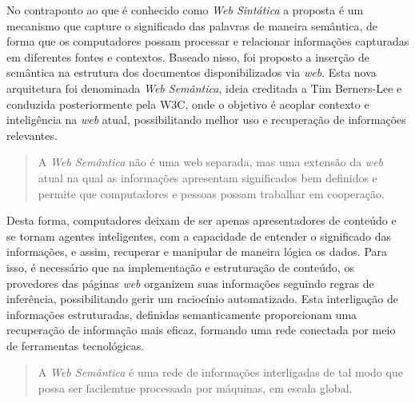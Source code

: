 No contraponto ao que é conhecido como \textit{Web Sintática}\cite{berners:2001} a proposta é um mecanismo que capture o significado das palavras de maneira semântica, de forma que os computadores possam processar e relacionar informações capturadas em diferentes fontes e contextos. Baseado nisso, foi proposto a inserção de semântica na estrutura dos documentos disponibilizados via \textit{web}\cite{breitman:2006}. Esta nova arquitetura foi denominada \textit{Web Semântica}, ideia creditada a Tim Berners-Lee e conduzida posteriormente pela W3C, onde o objetivo é acoplar contexto e inteligência na \textit{web} atual, possibilitando melhor uso e recuperação de informações relevantes\cite{souza:2004}.

\begin{quote}
A \textit{Web Semântica} não é uma web separada, mas uma extensão da \textit{web} atual na qual as informações apresentam significados bem definidos e permite que computadores e pessoas possam trabalhar em cooperação\cite{berners:2001}.
\end{quote}

Desta forma, computadores deixam de ser apenas apresentadores de conteúdo e se tornam agentes inteligentes, com a capacidade de entender o significado das informações, e assim, recuperar e manipular de maneira lógica os dados. Para isso, é necessário que na implementação e estruturação de conteúdo, os provedores das páginas \textit{web} organizem suas informações seguindo regras de inferência, possibilitando gerir um raciocínio automatizado\cite{berners:2001}. Esta interligação de informações estruturadas, definidas semanticamente proporcionam uma recuperação de informação mais eficaz, formando uma rede conectada por meio de ferramentas tecnológicas\cite{alves:2004}.

\begin{quote}
A \textit{Web Semântica} é uma rede de informações interligadas de tal modo que possa ser facilemtne processada por máquinas, em escala global\cite{palmer:2009}.
\end{quote}

